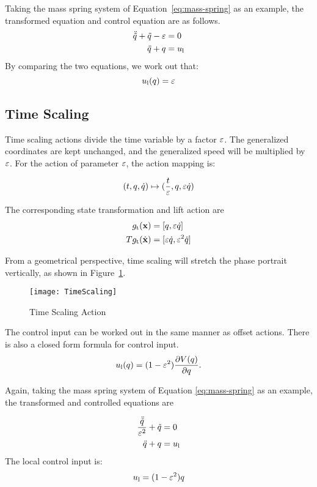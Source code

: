 Taking the mass spring system of Equation~\ref{eq:mass-spring} as an example, the transformed equation  and control equation are as follows.
\begin{align}
\ddot{\tilde{q}}+\tilde{q}-\varepsilon&=0 \nonumber \\
\ddot{q}+q&=u_{\mathrm{l}} \nonumber
\end{align}
By comparing the two equations, we work out that:
\[
u_{\mathrm{l}}(q)=\varepsilon
\]




\subsection*{Time Scaling}

Time scaling actions divide the time variable by a factor $\varepsilon$.
The generalized coordinates are kept unchanged, and the generalized speed will be multiplied by $\varepsilon$.
For the action of parameter $\varepsilon$, the action mapping is: 


\[
(t,q,\dot{q}) \mapsto (\frac{t}{\varepsilon},q,\varepsilon \dot{q})
\]

The corresponding state transformation and lift action are
\begin{align}
g_{\mathrm{t}}(\mathbf{x})&=[q,\varepsilon \dot{q}] \nonumber \\
Tg_{\mathrm{t}}(\dot{\mathbf{x}})&=[\varepsilon \dot{q},\varepsilon^2 \ddot{q}]\nonumber
\end{align}

From a geometrical perspective, time scaling will stretch the phase portrait vertically, as shown in Figure~\ref{fig:gts}.
\begin{figure}[!htbp]
  \begin{center}
    \texttt{[image: TimeScaling]}
	 \caption{Time Scaling Action}
    \label{fig:gts}
\end{center}
\end{figure}

The control input can be worked out in the same manner as offset actions.
There is also a closed form formula for control input.
\begin{equation}
u_{\mathrm{l}}(q) = (1-\varepsilon^2) \frac{\partial V(q)}{\partial q}.
\end{equation}

Again, taking the mass spring system of Equation \ref{eq:mass-spring} as an example, the transformed and controlled equations are

\begin{align}
\frac{\ddot{\tilde{q}}}{\varepsilon^2}+\tilde{q}&=0 \nonumber \\
\ddot{q}+q&=u_{\mathrm{l}} \nonumber
\end{align}
The local control input is:
\[
u_{\mathrm{l}}=(1-\varepsilon^2)q
\]




